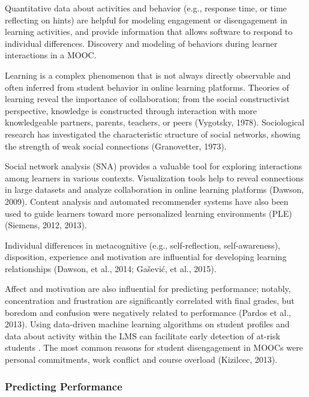 \documentclass[sigconf]{acmart}
\begin{document}
Quantitative data about activities and behavior (e.g., response time, or 
time reflecting on hints) are helpful for modeling engagement or disengagement 
in learning activities, and provide information that allows software to respond 
to individual differences. Discovery and modeling of behaviors during learner 
interactions in a MOOC. 


Learning is a complex phenomenon that is not always directly observable and 
often inferred from student behavior in online learning platforms. Theories of 
learning reveal the importance of collaboration; from the social constructivist 
perspective, knowledge is constructed through interaction with more knowledgeable
partners, parents, teachers, or peers (Vygotsky, 1978). Sociological research
has investigated the characteristic structure of social networks, showing the 
strength of weak social connections (Granovetter, 1973). 

Social network analysis 
(SNA) provides a valuable tool for exploring interactions among learners in 
various contexts. Visualization tools help to reveal connections in large 
datasets and analyze collaboration in online learning platforms (Dawson, 2009). 
Content analysis and automated recommender systems have also been used to guide 
learners toward more personalized learning environments (PLE) (Siemens, 2012, 2013). 

Individual differences in metacognitive (e.g., self-reflection, self-awareness), 
disposition, experience and motivation are influential for developing learning 
relationships (Dawson, et al., 2014; Gašević, et al., 2015). 

Affect and motivation are also 
influential for predicting performance; notably, concentration and 
frustration are significantly correlated with final grades, but boredom and 
confusion were negatively related to performance (Pardos et al., 2013). 
Using data-driven machine learning algorithms on student profiles and data 
about activity within the LMS can facilitate early detection of at-risk 
students \cite{Dekkar09}.  The most 
common reasons for  student disengagement in MOOCs were personal commitments, 
work conflict and course overload (Kizilcec, 2013). 

\subsubsection{Predicting Performance} 
\end{document}
